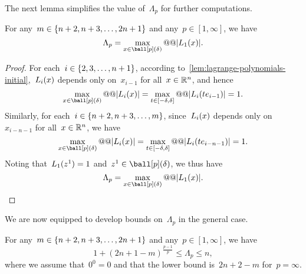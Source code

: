 The next lemma simplifies the value of~$\Lambda_p$ for further computations.

\begin{lemma}
    \label{lem:lambda-poisedness-initial-simple}
    For any~$m \in \{n + 2, n + 3, \dots, 2n + 1\}$ and any~$p \in [1, \infty]$, we have
    \begin{equation}
        \label{eq:lambda-poisedness-initial-simple}
        \Lambda_p = \max_{\iter \in \ball[p](\delta)} @@ \abs{\lagp[1](\iter)}.
    \end{equation}
\end{lemma}

\begin{proof}
    For each~$i \in \{2, 3, \dots, n + 1\}$, according to~\cref{lem:lagrange-polynomials-initial},~$\lagp[i](\iter)$ depends only on~$x_{i - 1}$ for all~$\iter \in \R^n$, and hence
    \begin{equation*}
        \max_{\iter \in \ball[p](\delta)} @@ \abs{\lagp[i](\iter)} = \max_{t \in [-\delta, \delta]} @@ \abs{\lagp[i](t e_{i - 1})} = 1.
    \end{equation*}
    Similarly, for each~$i \in \{n + 2, n + 3, \dots, m\}$, since~$\lagp[i](\iter)$ depends only on~$x_{i - n - 1}$ for all~$\iter \in \R^n$, we have
    \begin{equation*}
        \max_{\iter \in \ball[p](\delta)} @@ \abs{\lagp[i](\iter)} = \max_{t \in [-\delta, \delta]} @@ \abs{\lagp[i](t e_{i - n - 1})} = 1.
    \end{equation*}
    Noting that~$\lagp[1](z^1) = 1$ and~$z^1 \in \ball[p](\delta)$, we thus have
    \begin{equation*}
        \Lambda_p = \max_{\iter \in \ball[p](\delta)} @@ \abs{\lagp[1](\iter)}.
    \end{equation*}
\end{proof}

We are now equipped to develop bounds on~$\Lambda_p$ in the general case.

\begin{theorem}
    \label{thm:lambda-poisedness-initial}
    For any~$m \in \{n + 2, n + 3, \dots, 2n + 1\}$ and any~$p \in [1, \infty]$, we have
    \begin{equation*}
        1 + (2n + 1 - m)^{\frac{p - 1}{p}} \le \Lambda_p \le n,
    \end{equation*}
    where we assume that~$0^0 = 0$ and that the lower bound is~$2n + 2 - m$ for~$p = \infty$.
\end{theorem}

